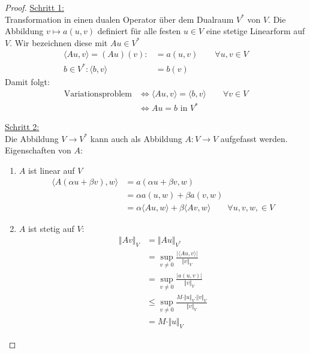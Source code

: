 \begin{proof}
	\underline{Schritt 1:}\\
	Transformation in einen dualen Operator über dem Dualraum $V^\ast$ von $V$.
	Die Abbildung $v\mapsto a(u,v)$ definiert für alle festen $u\in V$ eine stetige Linearform auf $V$.
	Wir bezeichnen diese mit $Au\in V^\ast$
	\begin{align*}
		\langle Au,v\rangle=(Au)(v):&=a(u,v)\qquad\forall u,v\in V \\
		b\in V^\ast: \langle b,v\rangle&=b(v)
	\end{align*}
	Damit folgt:
	\begin{align*}
		\text{Variationsproblem}&\Longleftrightarrow\langle Au,v\rangle=\langle b,v\rangle\qquad\forall v\in V\\
		&\Longleftrightarrow Au=b\text{ in }V^\ast
	\end{align*}

	\underline{Schritt 2:}\\
	Die Abbildung $V\to V^\ast$ kann auch als Abbildung $A:V\to V$ aufgefasst werden.
	Eigenschaften von $A$:
	\begin{enumerate}[label=(\alph*)]
		\item $A$ ist linear auf $V$
		\begin{align*}
			\big\langle A(\alpha u+\beta v),w\big\rangle
			&=a(\alpha u+\beta v,w)\\
			&=\alpha a(u,w)+\beta a(v,w)\\
			&=\alpha\langle Au,w\rangle+\beta\langle Av,w\rangle\qquad\forall u,v,w,\in V
		\end{align*}
		\item $A$ ist stetig auf $V$:
		\begin{align*}
			\Vert A v\Vert_{V}
			&=\Vert A u\Vert_{V^\ast}\\
			&=\sup\limits_{v\neq0}\frac{\big|\langle Au,v\rangle\big|}{\Vert v\Vert_V}\\
			&=\sup\limits_{v\neq0}\frac{\big|a(u,v)\big|}{\Vert v\Vert_V}\\
			&\leq
			\sup\limits_{v\neq0}\frac{M\cdot\Vert u\Vert_V\cdot\Vert v\Vert_V}{\Vert v\Vert_V}\\
			&=M\cdot\Vert u\Vert_V
		\end{align*}
	\end{enumerate}


\end{proof}
